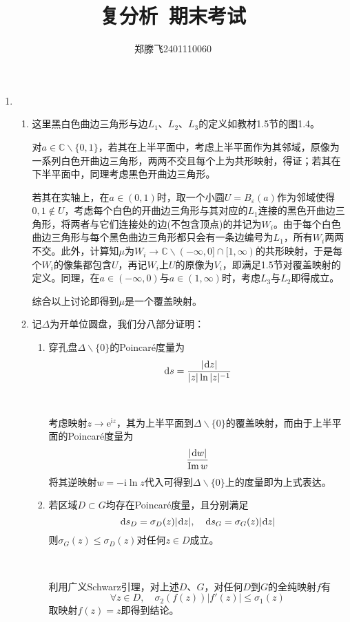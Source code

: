 \documentclass[a4paper,UTF8,fontset=windows,10pt]{ctexart}
\title{\heiti 复分析\ 期末考试}
\author{郑滕飞2401110060}
\date{}
\newcommand*{\er}{\mathrm{e}}
\newcommand*{\ir}{\mathrm{i}}
\newcommand*{\dr}{\hspace{0.07em}\mathrm{d}}
\newcommand*{\im}{\mathrm{Im}\,}
\begin{document}
\maketitle
\begin{enumerate}
    \item 
    \begin{enumerate}
        \item 
        这里黑白色曲边三角形与边$L_1$、$L_2$、$L_3$的定义如教材1.5节的图1.4。
        
        对$a\in\mathbb{C}\backslash\{0,1\}$，若其在上半平面中，考虑上半平面作为其邻域，原像为一系列白色开曲边三角形，两两不交且每个上为共形映射，得证；若其在下半平面中，同理考虑黑色开曲边三角形。
    
        若其在实轴上，在$a\in(0,1)$时，取一个小圆$U=B_\varepsilon(a)$作为邻域使得$0,1\notin U$，考虑每个白色的开曲边三角形与其对应的$L_1$连接的黑色开曲边三角形，将两者与它们连接处的边(不包含顶点)的并记为$W_i$。由于每个白色曲边三角形与每个黑色曲边三角形都只会有一条边编号为$L_1$，所有$W_i$两两不交。此外，计算知$\mu$为$W_i\to\mathbb{C}\backslash(-\infty,0]\cap[1,\infty)$的共形映射，于是每个$W_i$的像集都包含$U$，再记$W_i$上$U$的原像为$V_i$，即满足1.5节对覆盖映射的定义。同理，在$a\in(-\infty,0)$与$a\in(1,\infty)$时，考虑$L_3$与$L_2$即得成立。

        综合以上讨论即得到$\mu$是一个覆盖映射。

        \item
        记$\Delta$为开单位圆盘，我们分八部分证明：
        \begin{enumerate}
            \item 穿孔盘$\Delta\backslash\{0\}$的Poincar\'e度量为
            $$\dr s=\frac{|\dr z|}{|z|\ln|z|^{-1}}$$
            
            \

            考虑映射$z\to\er^{\ir z}$，其为上半平面到$\Delta\backslash\{0\}$的覆盖映射，而由于上半平面的Poincar\'e度量为
            $$\frac{|\dr w|}{\im w}$$
            将其逆映射$w=-\ir\ln z$代入可得到$\Delta\backslash\{0\}$上的度量即为上式表达。

            \item 若区域$D\subset G$均存在Poincar\'e度量，且分别满足
            $$\dr s_D=\sigma_D(z)|\dr z|,\quad\dr s_G=\sigma_G(z)|\dr z|$$
            则$\sigma_G(z)\le\sigma_D(z)$对任何$z\in D$成立。
            
            \

            利用广义Schwarz引理，对上述$D$、$G$，对任何$D$到$G$的全纯映射$f$有
            $$\forall z\in D,\quad\sigma_2(f(z))|f'(z)|\le\sigma_1(z)$$
            取映射$f(z)=z$即得到结论。


\end{enumerate}
\end{enumerate}
\end{enumerate}
\end{document}
